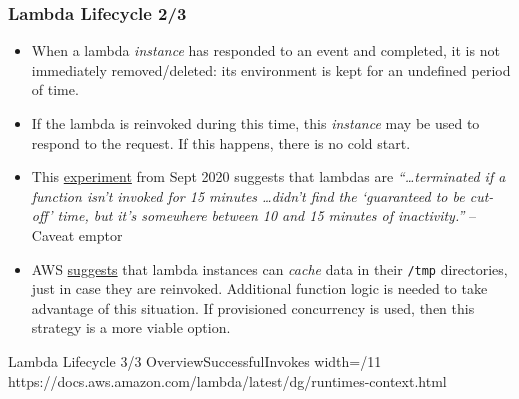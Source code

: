 \documentclass[11pt,aspectratio=169]{beamer}
\begin{document}
\begin{nrcanFrame}
  \frametitle{Lambda Lifecycle 2/3}
  \begin{itemize}
    \item When a lambda \textit{instance} has responded to an event and completed, it is \alert{not immediately removed/deleted}:
  its environment is kept for an undefined period of time.
\item If the lambda is reinvoked during this time, this \textit{instance} may be used to respond to the request.
  \alert{If this happens, there is no cold start}.
\item This
  \href{https://xebia.com/blog/til-that-aws-lambda-terminates-instances-preemptively/}{experiment}
  from Sept 2020 suggests that lambdas are
  \textit{``\dots terminated
    if a  function isn’t invoked for 15 minutes \ldots didn’t find the
    ‘guaranteed to be cut-off’ time, but it’s somewhere between 10 and
    15 minutes of inactivity.''} -- Caveat emptor
\item 
  AWS
  \href{https://docs.aws.amazon.com/lambda/latest/dg/runtimes-context.html\#runtimes-lifecycle-shutdown}{suggests}
  that lambda instances can \textit{cache} data in their \texttt{/tmp} directories, just in case they are reinvoked.
  Additional function logic is needed to take advantage of this situation.
  If provisioned concurrency is used, then this strategy is a more
  viable option.
  \end{itemize}
\end{nrcanFrame}

\nrcanGraphicFrame
  {Lambda Lifecycle 3/3}
  {OverviewSuccessfulInvokes}
  {width=/11}
  {https://docs.aws.amazon.com/lambda/latest/dg/runtimes-context.html}
\end{document}
